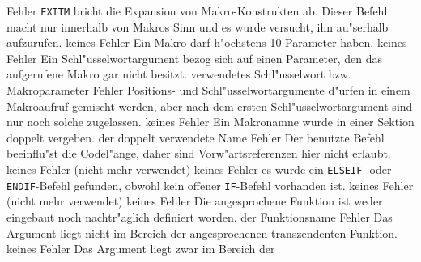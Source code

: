 \documentclass[12pt,a4paper,twoside]{report}
\newcommand{\tty}[1]{{\tt #1}}
\begin{document}
\begin{description}
               {Fehler}
               {\tty{EXITM} bricht die Expansion von
                Makro-Konstrukten ab.  Dieser Befehl macht nur innerhalb
                von Makros Sinn und es wurde versucht, ihn au"serhalb
                aufzurufen.}
               {keines}
               {Fehler}
               {Ein Makro darf h"ochstens 10 Parameter haben.}
               {keines}
               {Fehler}
               {Ein Schl"usselwortargument bezog sich auf einen
                Parameter, den das aufgerufene Makro gar nicht
                besitzt.}
               {verwendetes Schl"usselwort bzw. Makroparameter}
               {Fehler}
               {Positions- und Schl"usselwortargumente d"urfen in
                einem Makroaufruf gemischt werden, aber nach dem
                ersten Schl"usselwortargument sind nur noch
                solche zugelassen.}
               {keines}
               {Fehler}
               {Ein Makronamne wurde in einer Sektion doppelt
                vergeben.}
               {der doppelt verwendete Name}
               {Fehler}
               {Der benutzte Befehl beeinflu"st die Codel"ange,
                daher sind Vorw"artsreferenzen hier nicht erlaubt.}
               {keines}
               {Fehler}
               {(nicht mehr verwendet)}
               {keines}
               {Fehler}
               {es wurde ein \tty{ELSEIF}- oder \tty{ENDIF}-Befehl gefunden,
                obwohl kein offener \tty{IF}-Befehl vorhanden ist.}
               {keines}
               {Fehler}
               {(nicht mehr verwendet)}
               {keines}
               {Fehler}
               {Die angesprochene Funktion ist weder eingebaut
                noch nachtr"aglich definiert worden.}
               {der Funktionsname}
               {Fehler}
               {Das Argument liegt nicht im Bereich der
                angesprochenen transzendenten Funktion.}
               {keines}
               {Fehler}
               {Das Argument liegt zwar im Bereich der
}
\end{description}
\end{document}
